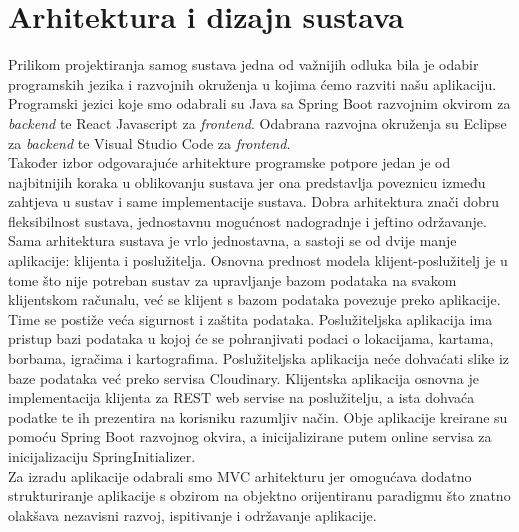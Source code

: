 \chapter{Arhitektura i dizajn sustava}
		


		{Prilikom projektiranja samog sustava jedna od važnijih odluka bila je odabir programskih jezika i razvojnih okruženja u kojima ćemo razviti našu aplikaciju. Programski jezici koje smo odabrali su Java sa Spring Boot razvojnim okvirom za \textit{backend} te React Javascript za \textit{frontend}. Odabrana razvojna okruženja su Eclipse za \textit{backend} te Visual Studio Code za \textit{frontend}.}	\\
		{Također izbor odgovarajuće arhitekture programske potpore jedan je od najbitnijih koraka u oblikovanju sustava jer ona predstavlja poveznicu između zahtjeva u sustav i same implementacije sustava. Dobra arhitektura znači dobru fleksibilnost sustava, jednostavnu mogućnost nadogradnje i jeftino održavanje.}\\
		{Sama arhitektura sustava je vrlo jednostavna, a sastoji se od dvije manje aplikacije: klijenta i poslužitelja. Osnovna prednost modela klijent-poslužitelj je u tome što nije potreban sustav za upravljanje bazom podataka na svakom klijentskom računalu, već se klijent s bazom podataka povezuje preko aplikacije. Time se postiže veća sigurnost i zaštita podataka. Poslužiteljska aplikacija ima pristup bazi podataka u kojoj će se pohranjivati podaci o lokacijama, kartama, borbama, igračima i kartografima. Poslužiteljska aplikacija neće dohvaćati slike iz baze podataka već preko servisa Cloudinary. Klijentska aplikacija osnovna je implementacija klijenta za REST web servise na poslužitelju, a ista dohvaća podatke te ih prezentira na korisniku razumljiv način. Obje aplikacije kreirane su pomoću Spring Boot razvojnog okvira, a inicijalizirane putem online servisa za inicijalizaciju SpringInitializer.}\\
		{Za izradu aplikacije odabrali smo MVC arhitekturu jer omogućava dodatno strukturiranje aplikacije s obzirom na objektno orijentiranu paradigmu što znatno olakšava nezavisni razvoj, ispitivanje i održavanje aplikacije.}		

